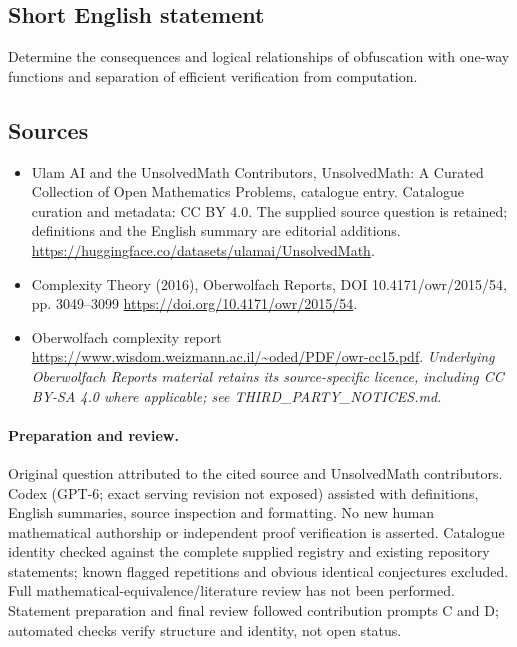 \documentclass[11pt]{article}
\begin{document}
\subsection{Short English statement}
Determine the consequences and logical relationships of obfuscation with one-way functions and separation of efficient verification from computation.
\subsection{Sources}
\begin{itemize}
\item[\hypertarget{source:statement:1}{S1}] Ulam AI and the UnsolvedMath Contributors, UnsolvedMath: A Curated Collection of Open Mathematics Problems, catalogue entry. Catalogue curation and metadata: CC BY 4.0. The supplied source question is retained; definitions and the English summary are editorial additions.
\url{https://huggingface.co/datasets/ulamai/UnsolvedMath}.
\item[\hypertarget{source:statement:2}{S2}] Complexity Theory (2016), Oberwolfach Reports, DOI 10.4171/owr/2015/54, pp. 3049--3099
\url{https://doi.org/10.4171/owr/2015/54}.
\item[\hypertarget{source:statement:3}{S3}] Oberwolfach complexity report
\url{https://www.wisdom.weizmann.ac.il/~oded/PDF/owr-cc15.pdf}.
\textit{Underlying Oberwolfach Reports material retains its source-specific licence, including CC BY-SA 4.0 where applicable; see THIRD\_PARTY\_NOTICES.md.}
\end{itemize}
\paragraph{Preparation and review.}
Original question attributed to the cited source and UnsolvedMath contributors. Codex (GPT-6; exact serving revision not exposed) assisted with definitions, English summaries, source inspection and formatting. No new human mathematical authorship or independent proof verification is asserted. Catalogue identity checked against the complete supplied registry and existing repository statements; known flagged repetitions and obvious identical conjectures excluded. Full mathematical-equivalence/literature review has not been performed. Statement preparation and final review followed contribution prompts C and D; automated checks verify structure and identity, not open status.
\label{end:statement}
\end{document}
